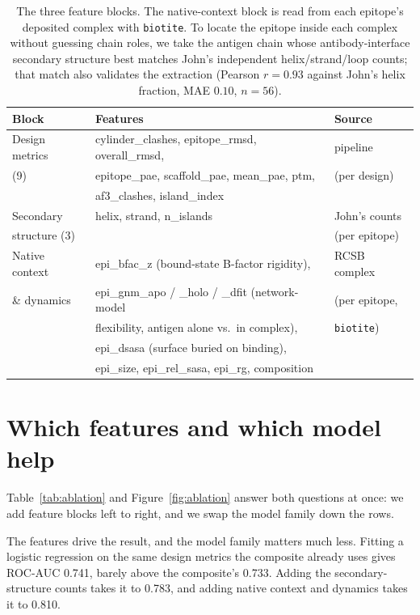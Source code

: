 \documentclass[11pt]{article}
\begin{document}
\begin{table}[h]
\centering
\caption{The three feature blocks. The native-context block is read from each epitope's deposited
complex with \texttt{biotite}. To locate the epitope inside each complex without guessing chain roles,
we take the antigen chain whose antibody-interface secondary structure best matches John's independent
helix/strand/loop counts; that match also validates the extraction (Pearson $r=0.93$ against John's
helix fraction, MAE $0.10$, $n=56$).}
\label{tab:features}
\small
\begin{tabular}{@{}lll@{}}
\toprule
Block & Features & Source \\
\midrule
Design metrics & cylinder\_clashes, epitope\_rmsd, overall\_rmsd, & pipeline \\
(9) & epitope\_pae, scaffold\_pae, mean\_pae, ptm, & (per design) \\
 & af3\_clashes, island\_index & \\[0.4em]
Secondary & helix, strand, n\_islands & John's counts \\
structure (3) & & (per epitope) \\[0.4em]
Native context & epi\_bfac\_z (bound-state B-factor rigidity), & RCSB complex \\
\& dynamics & epi\_gnm\_apo / \_holo / \_dfit (network-model & (per epitope, \\
 & flexibility, antigen alone vs.\ in complex), & \texttt{biotite}) \\
 & epi\_dsasa (surface buried on binding), & \\
 & epi\_size, epi\_rel\_sasa, epi\_rg, composition & \\
\bottomrule
\end{tabular}
\end{table}

\section{Which features and which model help}

Table~\ref{tab:ablation} and Figure~\ref{fig:ablation} answer both questions at once: we add feature
blocks left to right, and we swap the model family down the rows.

The features drive the result, and the model family matters much less. Fitting a logistic regression on
the same design metrics the composite already uses gives ROC-AUC 0.741, barely above the composite's
0.733. Adding the secondary-structure counts takes it to 0.783, and adding native context and dynamics
takes it to 0.810.
\end{document}
